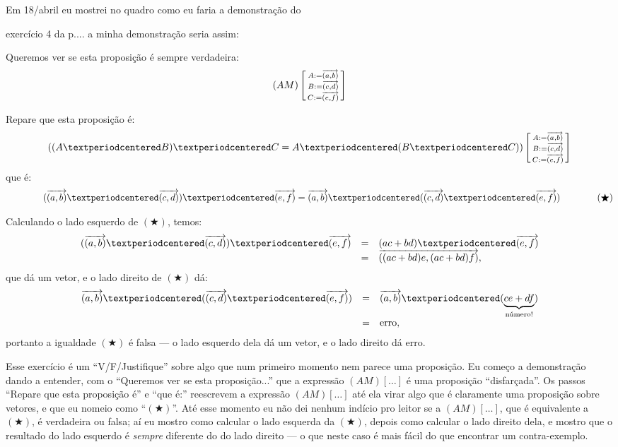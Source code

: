 \documentclass[oneside]{book}
\begin{document}

Em 18/abril eu mostrei no quadro como eu faria a demonstração do

exercício 4 da p.\pageref{propriedades-basicas}... a minha
demonstração seria assim:

\bsk

Queremos ver se esta proposição é sempre verdadeira:
%
$$(AM) \left[\begin {smallmatrix}A:={\overrightarrow{(a,b)}} \\ B:={\overrightarrow{(c,d)}} \\ C:={\overrightarrow{(e,f)}} \\\end{smallmatrix}\right]$$

Repare que esta proposição é:
%
$$((A·B)·C = A·(B·C)) \subst{A:=\vab \\ B:=\vcd \\ C:=\vef \\}$$
%
que é:
%
$$\qquad\qquad (\vab·\vcd)·\vef = \vab·(\vcd·\vef)  \qquad\qquad (\bigstar)$$

Calculando o lado esquerdo de $(\bigstar)$, temos:
%
$$\begin{array}{rcl}
  (\vab·\vcd)·\vef &=& (ac+bd)·\vef \\
                   &=& \VEC{(ac+bd)e, (ac+bd)f}, \\
  \end{array}
$$
%
que dá um vetor, e o lado direito de $(\bigstar)$ dá:
%
$$\begin{array}{rcl}
  \vab·(\vcd·\vef) &=& \vab·(\und{ce+df}{\text{número!}}) \\
                   &=& \erro, \\
  \end{array}
$$
%
portanto a igualdade $(\bigstar)$ é falsa --- o lado esquerdo dela dá
um vetor, e o lado direito dá erro.

\bsk

Esse exercício é um ``V/F/Justifique'' sobre algo que num primeiro
momento nem parece uma proposição. Eu começo a demonstração dando a
entender, com o ``Queremos ver se esta proposição...'' que a expressão
$(AM)[\ldots]$ é uma proposição ``disfarçada''. Os passos ``Repare que
esta proposição é'' e ``que é:'' reescrevem a expressão $(AM)[\ldots]$
até ela virar algo que é claramente uma proposição sobre vetores, e
que eu nomeio como ``$(\bigstar)$''. Até esse momento eu não dei
nenhum indício pro leitor se a $(AM)[\ldots]$, que é equivalente a
$(\bigstar)$, é verdadeira ou falsa; aí eu mostro como calcular o lado
esquerda da $(\bigstar)$, depois como calcular o lado direito dela, e
mostro que o resultado do lado esquerdo é {\sl sempre} diferente do do
lado direito --- o que neste caso é mais fácil do que encontrar um
contra-exemplo.
\end{document}
